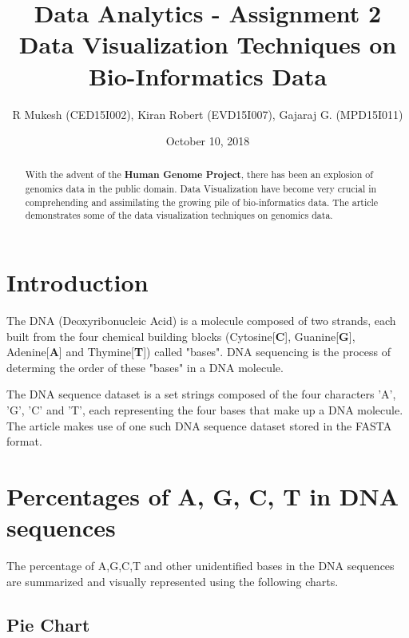 \documentclass{article}
\title{
	Data Analytics - Assignment 2 \\
	\large Data Visualization Techniques on Bio-Informatics Data
	}
\author{R Mukesh (CED15I002), Kiran Robert (EVD15I007), Gajaraj G. (MPD15I011)}
\affil{IIITDM, Kancheepuram}
\date{October 10, 2018}
\begin{document}
\maketitle

	\begin{abstract}
		With the advent of the \textbf{Human Genome Project}, there has been an explosion of genomics data in the public domain. Data Visualization have become very crucial in comprehending and assimilating the growing pile of bio-informatics data. The article demonstrates some of the data visualization techniques on genomics data.
	\end{abstract}
	
	\section{Introduction}
		The DNA (Deoxyribonucleic Acid) is a molecule composed of two strands, each built from the four chemical building blocks (Cytosine[\textbf{C}], Guanine[\textbf{G}], Adenine[\textbf{A}] and Thymine[\textbf{T}]) called "bases". DNA sequencing is the process of determing the order of these "bases" in a DNA molecule.
		
		The DNA sequence dataset is a set strings composed of the four characters 'A', 'G', 'C' and 'T', each representing the four bases that make up a DNA molecule. The article makes use of one such DNA sequence dataset stored in the FASTA format.
	
	\section{Percentages of A, G, C, T in DNA sequences}
	
		The percentage of A,G,C,T and other unidentified bases in the DNA sequences are summarized and visually represented using the following charts.
		
		\subsection{Pie Chart}
			
\end{document}
